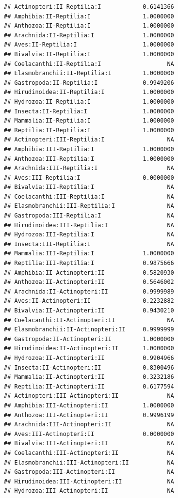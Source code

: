 \documentclass[
  12pt,
]{article}
\begin{document}
\begin{verbatim}
## Actinopteri:II-Reptilia:I            0.6141366
## Amphibia:II-Reptilia:I               1.0000000
## Anthozoa:II-Reptilia:I               1.0000000
## Arachnida:II-Reptilia:I              1.0000000
## Aves:II-Reptilia:I                   1.0000000
## Bivalvia:II-Reptilia:I               1.0000000
## Coelacanthi:II-Reptilia:I                   NA
## Elasmobranchii:II-Reptilia:I         1.0000000
## Gastropoda:II-Reptilia:I             0.9949206
## Hirudinoidea:II-Reptilia:I           1.0000000
## Hydrozoa:II-Reptilia:I               1.0000000
## Insecta:II-Reptilia:I                1.0000000
## Mammalia:II-Reptilia:I               1.0000000
## Reptilia:II-Reptilia:I               1.0000000
## Actinopteri:III-Reptilia:I                  NA
## Amphibia:III-Reptilia:I              1.0000000
## Anthozoa:III-Reptilia:I              1.0000000
## Arachnida:III-Reptilia:I                    NA
## Aves:III-Reptilia:I                  0.0000000
## Bivalvia:III-Reptilia:I                     NA
## Coelacanthi:III-Reptilia:I                  NA
## Elasmobranchii:III-Reptilia:I               NA
## Gastropoda:III-Reptilia:I                   NA
## Hirudinoidea:III-Reptilia:I                 NA
## Hydrozoa:III-Reptilia:I                     NA
## Insecta:III-Reptilia:I                      NA
## Mammalia:III-Reptilia:I              1.0000000
## Reptilia:III-Reptilia:I              0.9875666
## Amphibia:II-Actinopteri:II           0.5820930
## Anthozoa:II-Actinopteri:II           0.5646002
## Arachnida:II-Actinopteri:II          0.9999989
## Aves:II-Actinopteri:II               0.2232882
## Bivalvia:II-Actinopteri:II           0.9430210
## Coelacanthi:II-Actinopteri:II               NA
## Elasmobranchii:II-Actinopteri:II     0.9999999
## Gastropoda:II-Actinopteri:II         1.0000000
## Hirudinoidea:II-Actinopteri:II       1.0000000
## Hydrozoa:II-Actinopteri:II           0.9904966
## Insecta:II-Actinopteri:II            0.8300496
## Mammalia:II-Actinopteri:II           0.3232186
## Reptilia:II-Actinopteri:II           0.6177594
## Actinopteri:III-Actinopteri:II              NA
## Amphibia:III-Actinopteri:II          1.0000000
## Anthozoa:III-Actinopteri:II          0.9996199
## Arachnida:III-Actinopteri:II                NA
## Aves:III-Actinopteri:II              0.0000000
## Bivalvia:III-Actinopteri:II                 NA
## Coelacanthi:III-Actinopteri:II              NA
## Elasmobranchii:III-Actinopteri:II           NA
## Gastropoda:III-Actinopteri:II               NA
## Hirudinoidea:III-Actinopteri:II             NA
## Hydrozoa:III-Actinopteri:II                 NA

\end{verbatim}
\end{document}
